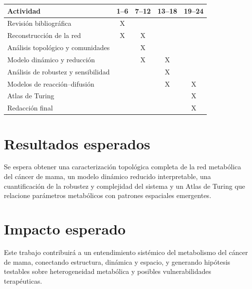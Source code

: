 \documentclass[12pt,spanish]{article}
\begin{document}
	\begin{longtable}{lcccc}
		\toprule
		\textbf{Actividad} & \textbf{1--6} & \textbf{7--12} & \textbf{13--18} & \textbf{19--24} \\
		\midrule
		Revisión bibliográfica & X &  &  &  \\
		Reconstrucción de la red & X & X &  &  \\
		Análisis topológico y comunidades &  & X &  &  \\
		Modelo dinámico y reducción &  & X & X &  \\
		Análisis de robustez y sensibilidad &  &  & X &  \\
		Modelos de reacción--difusión &  &  & X & X \\
		Atlas de Turing &  &  &  & X \\
		Redacción final &  &  &  & X \\
		\bottomrule
	\end{longtable}
	
	\section{Resultados esperados}
	
	Se espera obtener una caracterización topológica completa de la red metabólica del cáncer de mama, un modelo dinámico reducido interpretable, una cuantificación de la robustez y complejidad del sistema y un Atlas de Turing que relacione parámetros metabólicos con patrones espaciales emergentes.
	
	\section{Impacto esperado}
	
	Este trabajo contribuirá a un entendimiento sistémico del metabolismo del cáncer de mama, conectando estructura, dinámica y espacio, y generando hipótesis testables sobre heterogeneidad metabólica y posibles vulnerabilidades terapéuticas.
	
\end{document}

